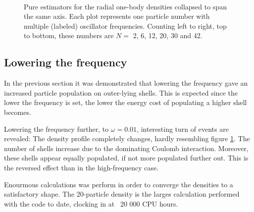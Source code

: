 \begin{figure}
\begin{center}
   \\
  \caption{Pure estimators for the radial one-body densities collapsed to span the same axis. Each plot represents one particle number with multiple (labeled) oscillator frequencies. Counting left to right, top to bottom, these numbers are $N=$ 2, 6, 12, 20, 30 and 42.}
  \label{fig:OBD_pure_collapsed}
 \end{center}
\end{figure}


\subsection{Lowering the frequency}

In the previous section it was demonstrated that lowering the frequency gave an increased particle population on outer-lying shells. This is expected since the lower the frequency is set, the lower the energy cost of populating a higher shell becomes.

Lowering the frequency further, to $\omega=0.01$, interesting turn of events are revealed: The density profile completely changes, hardly resembling figure \ref{fig:OBD_pure_collapsed}. The number of shells increase due to the dominating Coulomb interaction. Moreover, these shells appear equally populated, if not more populated further out. This is the reversed effect than in the high-frequency case.

Enourmous calculations was perform in order to converge the densities to a satisfactory shape. The 20-particle density is the larges calculation performed with the code to date, clocking in at ~20 000 CPU hours.

